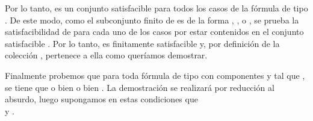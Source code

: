 \begin{isabellebody}
\begin{isamarkuptext}
\begin{demostracion}
    Por lo tanto,  es un conjunto satisfacible para todos los casos de la fórmula
     de tipo \isa{{\isasymalpha}}. De este modo, como el subconjunto finito  de  es de la forma
    , ,  o , se prueba la satisfacibilidad
    de  para cada uno de los casos por estar contenidos en el conjunto satisfacible
    . Por lo tanto,  es finitamente satisfacible y, por definición de 
    la colección , pertenece a ella como queríamos demostrar.

    Finalmente probemos que para toda fórmula  de tipo \isa{{\isasymbeta}} con componentes  y  tal que 
    , se tiene que o bien  o bien . La
    demostración se realizará por reducción al absurdo, luego supongamos en estas condiciones que\\
     y . 


\end{demostracion}
\end{isamarkuptext}
\end{isabellebody}
